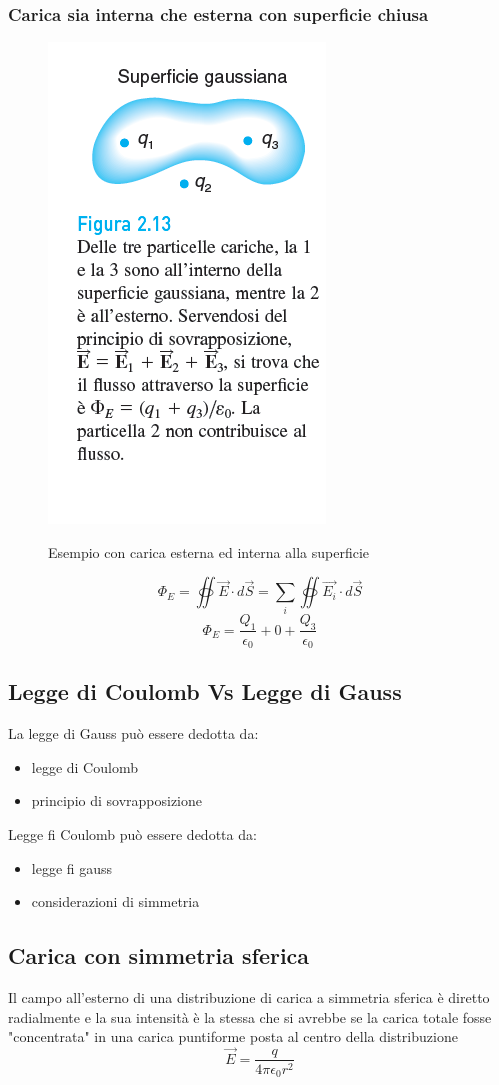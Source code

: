 \subsubsection{Carica sia interna che esterna con superficie chiusa}
\begin{figure}[H]
    \centering
    \includegraphics[width=0.25\linewidth]{imgs/8 - cariche esterne ed interne.png}
    \label{fig:carica_sia_interna_che_esterna}
    \caption{Esempio con carica esterna ed interna alla superficie}
\end{figure}

\begin{equation*}
    \Phi_E = \oiint{\vec{E}\cdot d\vec{S}} = \sum_i{\oiint{\vec{E_i}\cdot d\vec{S}}}
\end{equation*}
\begin{equation*}
    \Phi_E = \frac{Q_1}{\epsilon_0} + 0 + \frac{Q_3}{\epsilon_0}
\end{equation*}

\subsection{Legge di Coulomb Vs Legge di Gauss}
La legge di Gauss può essere dedotta da:
\begin{itemize}
    \item legge di Coulomb
    \item principio di sovrapposizione
\end{itemize}
Legge fi Coulomb può essere dedotta da:
\begin{itemize}
    \item legge fi gauss
    \item considerazioni di simmetria
\end{itemize}


\subsection{Carica con simmetria sferica}
Il campo all'esterno di una distribuzione di carica a simmetria sferica è diretto
radialmente e la sua intensità è la stessa che si avrebbe se la carica totale
fosse "concentrata" in una carica puntiforme posta al centro della
distribuzione
\begin{equation*}
    \vec{E} = \frac{q}{4\pi\epsilon_0 r^2}
\end{equation*}

